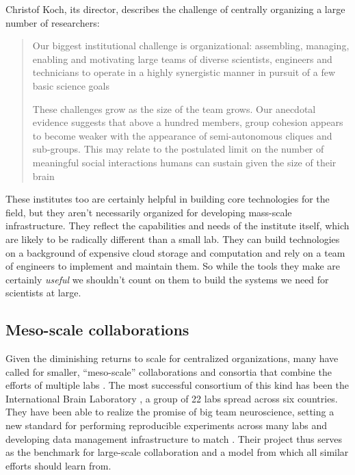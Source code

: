 Christof Koch, its director, describes the challenge of centrally
organizing a large number of researchers:

\begin{quote}
Our biggest institutional challenge is organizational: assembling,
managing, enabling and motivating large teams of diverse scientists,
engineers and technicians to operate in a highly synergistic manner in
pursuit of a few basic science goals \citep{grillnerWorldwideInitiativesAdvance2016} 

These challenges grow as the size of the team grows. Our anecdotal
evidence suggests that above a hundred members, group cohesion appears
to become weaker with the appearance of semi-autonomous cliques and
sub-groups. This may relate to the postulated limit on the number of
meaningful social interactions humans can sustain given the size of
their brain \citep{kochBigScienceTeam2016} 
\end{quote}

These institutes too are certainly helpful in building core technologies
for the field, but they aren't necessarily organized for developing
mass-scale infrastructure. They reflect the capabilities and needs of
the institute itself, which are likely to be radically different than a
small lab. They can build technologies on a background of expensive
cloud storage and computation and rely on a team of engineers to
implement and maintain them. So while the tools they make are certainly
\emph{useful} we shouldn't count on them to build the systems we need
for scientists at large.

\hypertarget{meso-scale-collaborations}{%
\subsection{Meso-scale collaborations}\label{meso-scale-collaborations}}

Given the diminishing returns to scale for centralized organizations,
many have called for smaller, ``meso-scale'' collaborations and
consortia that combine the efforts of multiple labs \citep{mainenBetterWayCrack2016} . The most successful consortium of this
kind has been the International Brain Laboratory \citep{abbottInternationalLaboratorySystems2017, woolKnowledgeNetworksHow2020} , a group of 22 labs spread across six countries. They have been
able to realize the promise of big team neuroscience, setting a new
standard for performing reproducible experiments across many labs \citep{laboratoryStandardizedReproducibleMeasurement2020}  and
developing data management infrastructure to match \citep{laboratoryDataArchitectureLargescale2020} . Their
project thus serves as the benchmark for large-scale collaboration and a
model from which all similar efforts should learn from.

